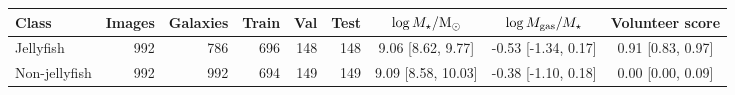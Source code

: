 \begin{tabular}{lrrrrrccc}
\hline
Class & Images & Galaxies & Train & Val & Test & $\log M_\star/{\rm M_\odot}$ & $\log M_{\rm gas}/M_\star$ & Volunteer score \\
\hline
Jellyfish & 992 & 786 & 696 & 148 & 148 & 9.06 [8.62, 9.77] & -0.53 [-1.34, 0.17] & 0.91 [0.83, 0.97] \\
Non-jellyfish & 992 & 992 & 694 & 149 & 149 & 9.09 [8.58, 10.03] & -0.38 [-1.10, 0.18] & 0.00 [0.00, 0.09] \\
\hline
\end{tabular}
